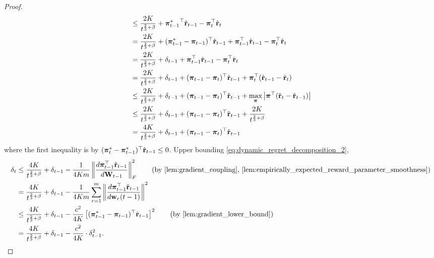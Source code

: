 \begin{proof}
\begin{equation}
\begin{split}
    &\le \frac{ 2 K }{t^{\frac{2}{3} + \beta}} + {{\boldsymbol{\pi}}_{t-1}^*}^\top \hat{{\mathbf{r}}}_{t-1} - {\boldsymbol{\pi}}_t^\top \hat{{\mathbf{r}}}_t \\
    &= \frac{ 2 K }{t^{\frac{2}{3} + \beta}} + ( {{\boldsymbol{\pi}}_{t-1}^*} - {\boldsymbol{\pi}}_{t-1} )^\top \hat{{\mathbf{r}}}_{t-1} + {\boldsymbol{\pi}}_{t-1}^\top \hat{{\mathbf{r}}}_{t-1} - {\boldsymbol{\pi}}_t^\top \hat{{\mathbf{r}}}_t \\
    &= \frac{ 2 K }{t^{\frac{2}{3} + \beta}} + \delta_{t-1} + {\boldsymbol{\pi}}_{t-1}^\top \hat{{\mathbf{r}}}_{t-1} - {\boldsymbol{\pi}}_t^\top \hat{{\mathbf{r}}}_t \\  
    &= \frac{ 2 K }{t^{\frac{2}{3} + \beta}} + \delta_{t-1} + ( {\boldsymbol{\pi}}_{t-1}  - {\boldsymbol{\pi}}_t )^\top \hat{{\mathbf{r}}}_{t-1} + {\boldsymbol{\pi}}_t^\top ( \hat{{\mathbf{r}}}_{t-1} - \hat{{\mathbf{r}}}_t) \\
    &\le \frac{ 2 K }{t^{\frac{2}{3} + \beta}} + \delta_{t-1} + ( {\boldsymbol{\pi}}_{t-1}  - {\boldsymbol{\pi}}_t )^\top \hat{{\mathbf{r}}}_{t-1} + \max\limits_{{\boldsymbol{\pi}}}{ \left| {\boldsymbol{\pi}}^\top ( \hat{{\mathbf{r}}}_t - \hat{{\mathbf{r}}}_{t-1}) \right| } \\
    &\le \frac{ 2 K }{t^{\frac{2}{3} + \beta}} + \delta_{t-1} + ( {\boldsymbol{\pi}}_{t-1}  - {\boldsymbol{\pi}}_t )^\top \hat{{\mathbf{r}}}_{t-1} + \frac{ 2 K }{t^{\frac{2}{3} + \beta}} \\
    &= \frac{ 4 K }{t^{\frac{2}{3} + \beta}} + \delta_{t-1} + ( {\boldsymbol{\pi}}_{t-1}  - {\boldsymbol{\pi}}_t )^\top \hat{{\mathbf{r}}}_{t-1}
\end{split}
\end{equation}
where the first inequality is by $( {{\boldsymbol{\pi}}_t^*} - {{\boldsymbol{\pi}}_{t-1}^*} )^\top \hat{{\mathbf{r}}}_{t-1} \le 0$. Upper bounding \cref{eq:dynamic_regret_decomposition_2},
\begin{equation}
\label{eq:dynamic_regret_decomposition_3}
\begin{split}
    \delta_t &\le \frac{ 4 K }{t^{\frac{2}{3} + \beta}} + \delta_{t-1} - \frac{1}{4 K m} \left\| \frac{d \rvpi_{t-1}^\top \hat{\rvr}_{t-1}}{d \rmW_{t-1}} \right\|_F^2  \qquad \left( \text{by \cref{lem:gradient_coupling}, \cref{lem:empirically_expected_reward_parameter_smoothness}}\right) \\
    &= \frac{ 4 K }{t^{\frac{2}{3} + \beta}} + \delta_{t-1} - \frac{1}{4 K m} \sum\limits_{r=1}^{m}{ \left\| \frac{d \rvpi_{t-1}^\top \hat{\rvr}_{t-1}}{d \rvw_r(t-1)} \right\|^2 } \\
    &\le \frac{ 4 K }{t^{\frac{2}{3} + \beta}} + \delta_{t-1} - \frac{c^2}{4 K} \left[ ( {\rvpi_{t-1}^*} - \rvpi_{t-1})^\top \hat{\rvr}_{t-1} \right]^2 \qquad \left( \text{by \cref{lem:gradient_lower_bound}}\right) \\
    &= \frac{ 4 K }{t^{\frac{2}{3} + \beta}} + \delta_{t-1} - \frac{c^2}{4 K} \cdot \delta_{t-1}^2.

\end{split}
\end{equation}
\end{proof}
